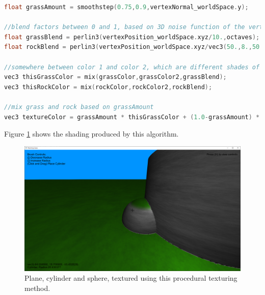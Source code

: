 \documentclass[11pt]{article}
\begin{document}
\begin{lstlisting}[language=C++,label={procedural_shading},caption={The variable \texttt{grassAmount} determines how much grass is visible at a given point. The noise used to define the rock color has been stretched in the x and z directions. The result is a color that changes more quickly as the y coordinate changes.}]
float grassAmount = smoothstep(0.75,0.9,vertexNormal_worldSpace.y);

//blend factors between 0 and 1, based on 3D noise function of the vertex position
float grassBlend = perlin3(vertexPosition_worldSpace.xyz/10.,octaves);
float rockBlend = perlin3(vertexPosition_worldSpace.xyz/vec3(50.,8.,50.),octaves);

//somewhere between color 1 and color 2, which are different shades of green, gray respectively
vec3 thisGrassColor = mix(grassColor,grassColor2,grassBlend);
vec3 thisRockColor = mix(rockColor,rockColor2,rockBlend);

//mix grass and rock based on grassAmount
vec3 textureColor = grassAmount * thisGrassColor + (1.0-grassAmount) * thisRockColor;    
\end{lstlisting}
Figure \ref{fig:procedural_shading_shapes} shows the shading produced by this algorithm.
\begin{figure}[H]
  \includegraphics[width=\textwidth]{procedural_shading_shapes.png}
  \caption{Plane, cylinder and sphere, textured using this procedural texturing method.}
  \label{fig:procedural_shading_shapes}
\end{figure}
\end{document}
